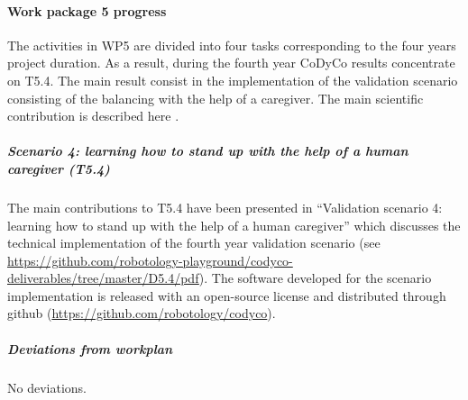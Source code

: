 
\paragraph{Work package 5 progress}

The activities in WP5 are divided into four tasks corresponding to the four years project duration. As a result, during the fourth year CoDyCo results concentrate on T5.4. The main result consist in the implementation of the validation scenario consisting of the balancing with the help of a caregiver. The main scientific contribution is described here \cite{latella2016whole}.

\subparagraph{Scenario 4: learning how to stand up with the help of a human caregiver (T5.4)}

The main contributions to T5.4 have been presented in ``Validation scenario 4: learning how to stand up with the help of a human caregiver'' which discusses the technical implementation of the fourth year validation scenario (see \url{https://github.com/robotology-playground/codyco-deliverables/tree/master/D5.4/pdf}). The software developed for the scenario implementation is released with an open-source license and distributed through github (\url{https://github.com/robotology/codyco}).

\subparagraph{Deviations from workplan}  

No deviations.

